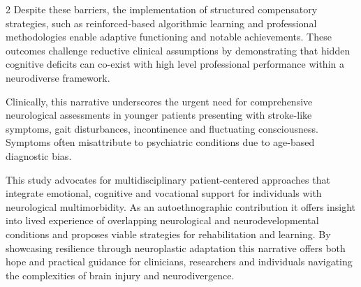 \documentclass{article}
\begin{document}
\begin{multicols}{2}
Despite these barriers, the implementation of structured compensatory strategies, such as reinforced-based algorithmic learning and professional methodologies enable adaptive functioning and notable achievements. These outcomes challenge reductive clinical assumptions by demonstrating that hidden cognitive deficits can co-exist with high level professional performance within a neurodiverse framework.

Clinically, this narrative underscores the urgent need for comprehensive neurological assessments in younger patients presenting with stroke-like symptoms, gait disturbances, incontinence and fluctuating consciousness. Symptoms often misattribute to psychiatric conditions due to age-based diagnostic bias.

This study advocates for multidisciplinary patient-centered approaches that integrate emotional, cognitive and vocational support for individuals with neurological multimorbidity. As an autoethnographic contribution it offers insight into lived experience of overlapping neurological and neurodevelopmental conditions and proposes viable strategies for rehabilitation and learning. By showcasing resilience through neuroplastic adaptation this narrative offers both hope and practical guidance for clinicians, researchers and individuals navigating the complexities of brain injury and neurodivergence.




\end{multicols}
\end{document}
